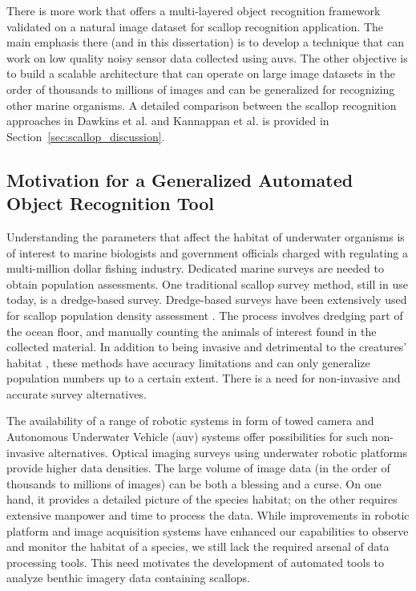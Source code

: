 There is more work \cite{prasanna_med, prasanna_aslo, prasanna_igi} that offers a multi-layered object recognition framework validated on
a natural image dataset for scallop recognition application. 
The main emphasis there (and in this dissertation) is to develop a technique that can work on low quality noisy sensor data collected using \gls{auv}s.
The other objective is to build a scalable architecture that can operate on 
large image datasets in the order of thousands to millions of images
and can be generalized for recognizing other marine organisms.
A detailed comparison between the scallop recognition approaches in Dawkins et al. \cite{dawkings13} and Kannappan et al.\cite{prasanna_igi} is provided in Section~\ref{sec:scallop_discussion}.


\subsection{Motivation for a Generalized Automated Object Recognition Tool}

Understanding the parameters that affect the habitat of underwater organisms is of interest to marine
biologists and government officials charged with regulating a multi-million dollar fishing industry. Dedicated
marine surveys are needed to obtain population assessments. One traditional scallop survey method, still
in use today,  is a dredge-based survey. Dredge-based surveys have been extensively used for scallop population density
assessment \cite{nefsc}. The process involves dredging part of the ocean floor, and manually counting the
animals of interest found in the collected material. In addition to being invasive and
detrimental to the creatures’ habitat \cite{jenkins}, these methods have accuracy
limitations and can only generalize population numbers up to a certain extent.
There is a need for non-invasive and accurate survey alternatives.

The availability of a range of robotic systems in form of towed camera and Autonomous Underwater Vehicle
(auv) systems offer possibilities for such non-invasive alternatives. Optical imaging surveys using underwater
robotic platforms provide higher data densities. The large volume of image data (in the order of thousands
to millions of images) can be both a blessing and a curse. On one hand, it provides a detailed picture of
the species habitat; on the other requires extensive manpower and time to process the data.
While improvements in robotic platform and image acquisition systems have enhanced our capabilities to
observe and monitor the habitat of a species, we still lack the required arsenal of data processing tools. This
need motivates the development of automated tools to analyze benthic imagery data containing scallops.


